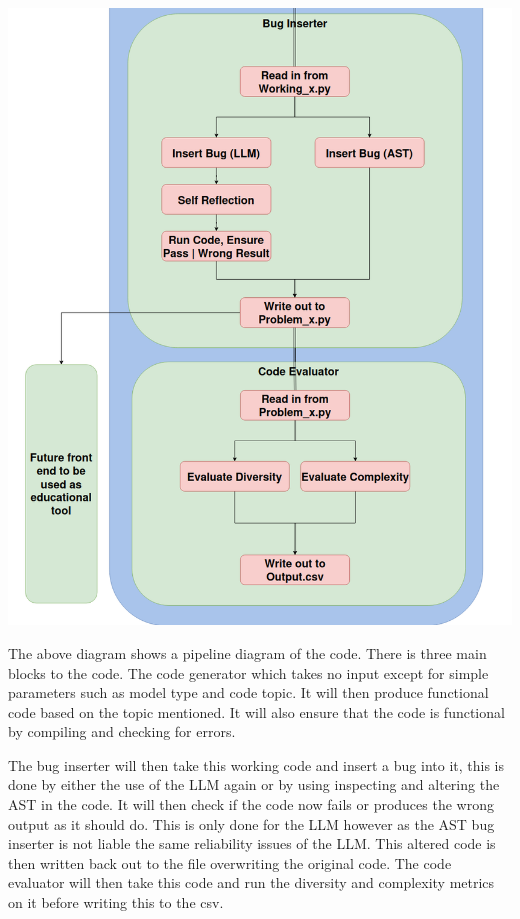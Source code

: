 \documentclass[12pt]{extarticle}
\begin{document}
\newpage
\includegraphics[width=\linewidth]{Images/Tall_design_2.png}

The above diagram shows a pipeline diagram of the code. There is three main blocks to the code. The code generator which takes no input except for simple parameters such as model type and code topic. It will then produce functional code based on the topic mentioned. It will also ensure that the code is functional by compiling and checking for errors. 

The bug inserter will then take this working code and insert a bug into it, this is done by either the use of the LLM again or by using inspecting and altering the AST in the code. It will then check if the code now fails or produces the wrong output as it should do. This is only done for the LLM however as the AST bug inserter is not liable the same reliability issues of the LLM. This altered code is then written back out to the file overwriting the original code. The code evaluator will then take this code and run the diversity and complexity metrics on it before writing this to the csv.
\end{document}
